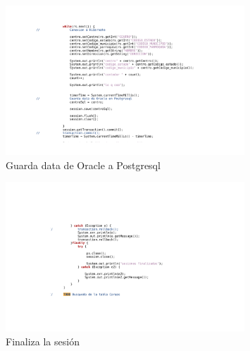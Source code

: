 \documentclass[12pt,oneside]{book}
\begin{document}
	\begin{figure}[H]
	\centering
	\includegraphics[width=0.8\textwidth]{migrate3.png}
	\caption{Guarda data de Oracle a Postgresql}
	\label{r1}
\end{figure}

\begin{figure}[H]
	\centering
	\includegraphics[width=0.8\textwidth]{migrate4.png}
	\caption{Finaliza la sesión}
	\label{t1}
\end{figure}

	 
	\appendix
	\scriptsize

	
\end{document}
